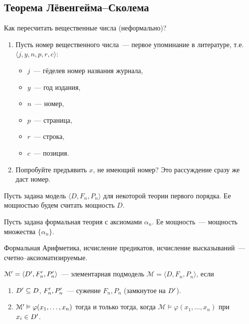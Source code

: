 \subsection{Теорема Лёвенгейма--Сколема}

Как пересчитать вещественные числа (неформально)?
\begin{enumerate}
    \item Пусть номер вещественного числа~--- первое упоминание в литературе, т.е. $\langle j, y, n, p, r, c\rangle$:
    \begin{itemize}
        \item $j$~--- гёделев номер названия журнала,
        \item $y$~--- год издания,
        \item $n$~--- номер,
        \item $p$~--- страница,
        \item $r$~--- строка,
        \item $c$~--- позиция.
    \end{itemize}
    \item Попробуйте предъявить $x$, не имеющий номер? Это рассуждение сразу же даст номер.
\end{enumerate}

\begin{definition}
    Пусть задана модель $\langle D, F_n, P_n \rangle$ для некоторой теории первого порядка. Ее мощностью будем считать мощность $D$.
\end{definition}

\begin{definition}
    Пусть задана формальная теория с аксиомами $\alpha_n$. Ее мощность~--- мощность множества $\{ \alpha_n \}$.
\end{definition}

\begin{example}
    Формальная Арифметика, исчисление предикатов, исчисление высказываний~--- счетно--ак\-си\-о\-ма\-ти\-зи\-ру\-емые.
\end{example}

\begin{definition}
    $\mathcal{M}^{\prime} = \langle D^{\prime}, F^{\prime}_n, P^{\prime}_n \rangle$~--- элементарная подмодель $\mathcal{M} = \langle D, F_n, P_n \rangle$, если
    \begin{enumerate}
        \item $D^{\prime} \subseteq D$, $F^{\prime}_n, P^{\prime}_n$~--- сужение $F_n, P_n$ (замкнутое на $D^{\prime}$).
        \item $\mathcal M^{\prime} \vDash \varphi(x_1, \dots, x_n)$ тогда и только тогда, когда $\mathcal{M} \vDash \varphi(x_1, \dots, x_n)$ при $x_i \in D^{\prime}$.
    \end{enumerate}
\end{definition}

